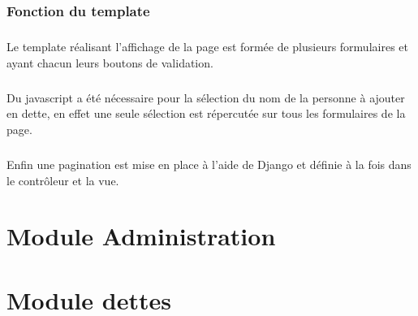 \documentclass[twoside,UTF8]{EPURapport}
\begin{document}
        \subsection{Fonction du template}

            \paragraph{}Le template réalisant l'affichage de la page est formée de plusieurs formulaires et ayant chacun leurs boutons de validation.

            \paragraph{}Du javascript a été nécessaire pour la sélection du nom de la personne à ajouter en dette, en effet une seule sélection est répercutée sur tous les formulaires de la page.

            \paragraph{}Enfin une pagination est mise en place à l'aide de Django et définie à la fois dans le contrôleur et la vue.


\chapter{Module Administration}

\chapter{Module dettes}

\end{document}

